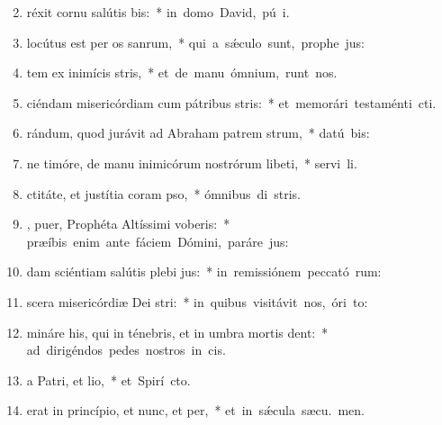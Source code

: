 \begin{flushleft}
\begin{enumerate}[leftmargin=*]
\setcounter{enumi}{1}

\item {}réxit cornu salútis bis:~* \mbox{in domo David, pú i.}
\item {} locútus est per os sanrum,~* \mbox{qui a s\'{\ae}culo sunt, prophe jus:}
\item {}tem ex inimícis stris,~* \mbox{et de manu ómnium,  runt nos.}
\item {}ciéndam misericórdiam cum pátribus stris:~* \mbox{et memorári testaménti  cti.}
\item {}rándum, quod jurávit ad Abraham patrem strum,~* \mbox{datú  bis:}
\item {}ne timóre, de manu inimicórum nostrórum libeti,~* \mbox{servi li.}
\item {}ctitáte, et justítia coram pso,~* \mbox{ómnibus di stris.}
\item {}, puer, Prophéta Altíssimi voberis:~* \mbox{præíbis enim ante fáciem Dómini, paráre  jus:}
\item {}dam sciéntiam salútis plebi jus:~* \mbox{in remissiónem peccató rum:}
\item {}scera misericórdiæ Dei stri:~* \mbox{in quibus visitávit nos, óri  to:}
\item {}mináre his, qui in ténebris, et in umbra mortis dent:~* \mbox{ad dirigéndos pedes nostros in  cis.}
\item {}a Patri, et lio,~* \mbox{et Spirí cto.}
\item {} erat in princípio, et nunc, et per,~* \mbox{et in s\'{\ae}cula sæcu. men.}


\end{enumerate}
\end{flushleft}


